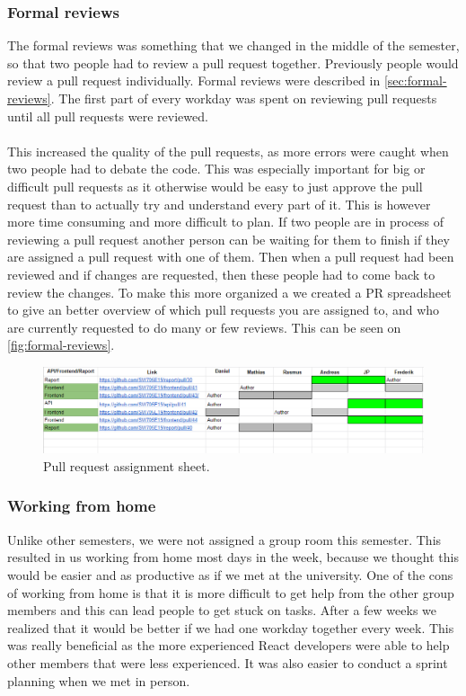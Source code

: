 \subsubsection{Formal reviews}
The formal reviews was something that we changed in the middle of the semester, so that two people had to review a pull request together.
Previously people would review a pull request individually.
Formal reviews were described in \autoref{sec:formal-reviews}.
The first part of every workday was spent on reviewing pull requests until all pull requests were reviewed.
\\\\
This increased the quality of the pull requests, as more errors were caught when two people had to debate the code.
This was especially important for big or difficult pull requests as it otherwise would be easy to just approve the pull request than to actually try and understand every part of it.
This is however more time consuming and more difficult to plan.
If two people are in process of reviewing a pull request another person can be waiting for them to finish if they are assigned a pull request with one of them. 
Then when a pull request had been reviewed and if changes are requested, then these people had to come back to review the changes.
To make this more organized a we created a PR spreadsheet to give an better overview of which pull requests you are assigned to, and who are currently requested to do many or few reviews.
This can be seen on \autoref{fig:formal-reviews}.
\begin{figure}[H]
    \centering
    \includegraphics[width=\linewidth]{figures/formal-reviews.PNG}
    \caption{Pull request assignment sheet.}
    \label{fig:formal-reviews}
\end{figure}

\subsubsection{Working from home}
Unlike other semesters, we were not assigned a group room this semester.
This resulted in us working from home most days in the week, because we thought this would be easier and as productive as if we met at the university.
One of the cons of working from home is that it is more difficult to get help from the other group members and this can lead people to get stuck on tasks.
After a few weeks we realized that it would be better if we had one workday together every week.
This was really beneficial as the more experienced React developers were able to help other members that were less experienced.
It was also easier to conduct a sprint planning when we met in person.

